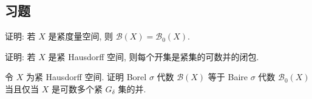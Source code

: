 \documentclass[../../main.tex]{subfiles}
\begin{document}
\subsection*{习题}

\begin{exercise}\label{exercise:ch21-22}
证明: 若 $X$ 是紧度量空间, 则 $\mathcal{B}(X)=\mathcal{B}_{0}(X)$.
\end{exercise}

\begin{exercise}\label{exercise:ch21-23}
证明: 若 $X$ 是紧 Hausdorff 空间, 则每个开集是紧集的可数并的闭包.
\end{exercise}

\begin{exercise}\label{exercise:ch21-24}
令 $X$ 为紧 Hausdorff 空间. 证明 Borel $\sigma$ 代数 $\mathcal{B}(X)$ 等于 Baire $\sigma$ 代数 $\mathcal{B}_{0}(X)$ 当且仅当 $X$ 是可数多个紧 $G_{\delta}$ 集的并.
\end{exercise}
\end{document}
